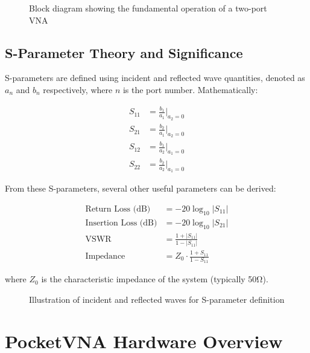 \documentclass[12pt,a4paper]{article}
\begin{document}
\begin{figure}[H]
    \centering
    \caption{Block diagram showing the fundamental operation of a two-port VNA}
    \label{fig:vna_block}
\end{figure}

\subsection{S-Parameter Theory and Significance}

S-parameters are defined using incident and reflected wave quantities, denoted as $a_n$ and $b_n$ respectively, where $n$ is the port number. Mathematically:

\begin{align}
    S_{11} &= \frac{b_1}{a_1}|_{a_2=0} \\
    S_{21} &= \frac{b_2}{a_1}|_{a_2=0} \\
    S_{12} &= \frac{b_1}{a_2}|_{a_1=0} \\
    S_{22} &= \frac{b_2}{a_2}|_{a_1=0}
\end{align}

From these S-parameters, several other useful parameters can be derived:

\begin{align}
    \text{Return Loss (dB)} &= -20\log_{10}|S_{11}| \\
    \text{Insertion Loss (dB)} &= -20\log_{10}|S_{21}| \\
    \text{VSWR} &= \frac{1+|S_{11}|}{1-|S_{11}|} \\
    \text{Impedance} &= Z_0 \cdot \frac{1+S_{11}}{1-S_{11}}
\end{align}

where $Z_0$ is the characteristic impedance of the system (typically 50Ω).

\begin{figure}[H]
    \centering
    \caption{Illustration of incident and reflected waves for S-parameter definition}
    \label{fig:s_param}
\end{figure}

\section{PocketVNA Hardware Overview}
\end{document}
